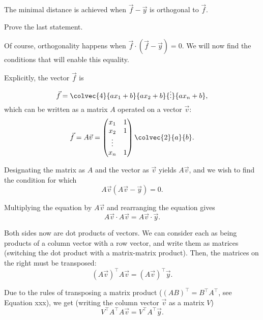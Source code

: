 The minimal distance is achieved when $\vec{f}-\vec{y}$ is orthogonal to $\vec{f}$.
\begin{challange}
  Prove the last statement.
\end{challange}

Of course, orthogonality happens when $\vec{f} \cdot \left( \vec{f}-\vec{y} \right)=0$. We will now find the conditions that will enable this equality.

Explicitly, the vector $\vec{f}$ is
\begin{equation*}
  \vec{f} = \colvec{4}{ax_{1}+b}{ax_{2}+b}{\vdots}{ax_{n}+b},
\end{equation*}
which can be written as a matrix $A$ operated on a vector $\vec{v}$:
\begin{equation*}
  \vec{f} = A\vec{v} = \begin{pmatrix} x_{1} & 1 \\ x_{2} & 1 \\ \vdots \\ x_{n} & 1 \end{pmatrix} \colvec{2}{a}{b}.
\end{equation*}

Designating the matrix as $A$ and the vector as $\vec{v}$ yields $A\vec{v}$, and we wish to find the condition for which
\begin{equation*}
  A\vec{v}\left( A\vec{v}-\vec{y} \right)=0.
\end{equation*}

Multiplying the equation by $A\vec{v}$ and rearranging the equation gives
\begin{equation*}
  A\vec{v} \cdot A\vec{v} = A\vec{v} \cdot \vec{y}.
\end{equation*}

Both sides now are dot products of vectors. We can consider each as being products of a column vector with a row vector, and write them as matrices (switching the dot product with a matrix-matrix product). Then, the matrices on the right must be transposed:
\begin{equation*}
  \left( A\vec{v} \right)^{\top} A\vec{v} = \left( A\vec{v} \right)^{\top}\vec{y}.
\end{equation*}

Due to the rules of transposing a matrix product ($\left( AB \right)^{\top} = B^{\top}A^{\top}$, see Equation xxx), we get (writing the column vector $\vec{v}$ as a matrix $V$)
\begin{equation*}
  V^{\top}A^{\top} A\vec{v} = V^{\top}A^{\top}\vec{y}.
\end{equation*}

